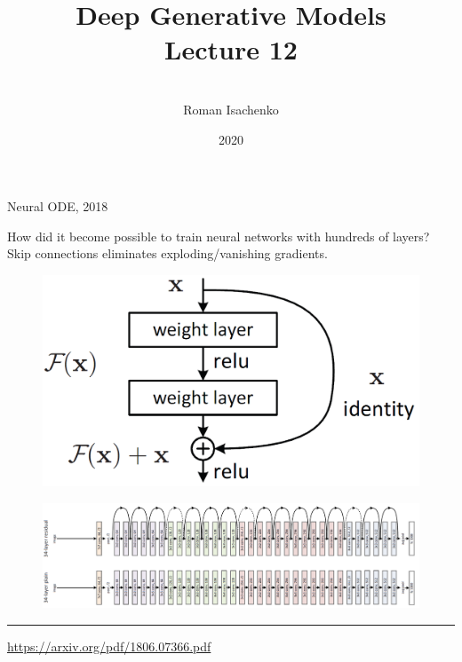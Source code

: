 \documentclass{beamer}
\title[\hbox to 56mm{Deep Generative Models  \hfill\insertframenumber\,/\,\inserttotalframenumber}]
{Deep Generative Models \\ Lecture 12}
\author[Roman Isachenko]{\\Roman Isachenko}
\institute[MIPT]{Moscow Institute of Physics and Technology \\
}
\date{2020}
\begin{document}
\begin{frame}
\titlepage
\end{frame}
\begin{frame}{Neural ODE, 2018}
\begin{minipage}[t]{0.6\columnwidth}
\vspace{0.2cm}
How did it become possible to train neural networks with hundreds of layers? \\
Skip connections eliminates exploding/vanishing gradients.
\end{minipage}%
\begin{minipage}[t]{0.4\columnwidth}
\begin{figure}
    \centering
    \includegraphics[width=0.95\linewidth]{figs/resnet_1.png}
\end{figure}
\end{minipage}
\begin{figure}
    \centering
    \includegraphics[width=\linewidth]{figs/resnet_2.png}
\end{figure}
\vfill
\hrule\medskip
{\scriptsize \href{https://arxiv.org/pdf/1806.07366.pdf}{https://arxiv.org/pdf/1806.07366.pdf}}   
\end{frame}
\end{document}
